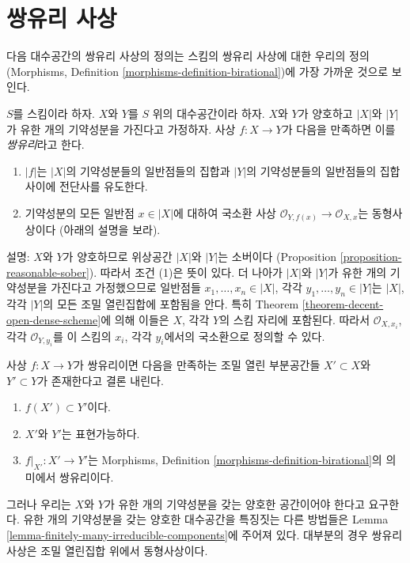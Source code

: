 \section{쌍유리 사상}
\label{section-birational}

\noindent
다음 대수공간의 쌍유리 사상의 정의는 스킴의 쌍유리 사상에 대한
우리의 정의(Morphisms, Definition
\ref{morphisms-definition-birational})에 가장 가까운 것으로 보인다.

\begin{definition}
\label{definition-birational}
$S$를 스킴이라 하자.
$X$와 $Y$를 $S$ 위의 대수공간이라 하자.
$X$와 $Y$가 양호하고 $|X|$와 $|Y|$가 유한 개의 기약성분을 가진다고
가정하자. 사상 $f : X \to Y$가 다음을 만족하면 이를
{\it 쌍유리}라고 한다.
\begin{enumerate}
\item $|f|$는 $|X|$의 기약성분들의 일반점들의 집합과 $|Y|$의
기약성분들의 일반점들의 집합 사이에 전단사를 유도한다.
\item 기약성분의 모든 일반점 $x \in |X|$에 대하여 국소환 사상
$\mathcal{O}_{Y, f(x)} \to \mathcal{O}_{X, x}$는 동형사상이다
(아래의 설명을 보라).
\end{enumerate}
\end{definition}

\noindent
설명: $X$와 $Y$가 양호하므로 위상공간 $|X|$와 $|Y|$는 소버이다
(Proposition \ref{proposition-reasonable-sober}). 따라서 조건 (1)은
뜻이 있다. 더 나아가 $|X|$와 $|Y|$가 유한 개의 기약성분을 가진다고
가정했으므로 일반점들 $x_1, \ldots, x_n \in |X|$, 각각
$y_1, \ldots, y_n \in |Y|$는 $|X|$, 각각 $|Y|$의 모든 조밀
열린집합에 포함됨을 안다. 특히 Theorem
\ref{theorem-decent-open-dense-scheme}에 의해 이들은 $X$, 각각
$Y$의 스킴 자리에 포함된다. 따라서 $\mathcal{O}_{X, x_i}$, 각각
$\mathcal{O}_{Y, y_i}$를 이 스킴의 $x_i$, 각각 $y_i$에서의
국소환으로 정의할 수 있다.

\medskip\noindent
사상 $f : X \to Y$가 쌍유리이면 다음을 만족하는 조밀 열린
부분공간들 $X' \subset X$와 $Y' \subset Y$가 존재한다고 결론 내린다.
\begin{enumerate}
\item $f(X') \subset Y'$이다.
\item $X'$와 $Y'$는 표현가능하다.
\item $f|_{X'} : X' \to Y'$는 Morphisms, Definition
\ref{morphisms-definition-birational}의 의미에서 쌍유리이다.
\end{enumerate}
그러나 우리는 $X$와 $Y$가 유한 개의 기약성분을 갖는 양호한
공간이어야 한다고 요구한다. 유한 개의 기약성분을 갖는 양호한
대수공간을 특징짓는 다른 방법들은 Lemma
\ref{lemma-finitely-many-irreducible-components}에 주어져 있다.
대부분의 경우 쌍유리 사상은 조밀 열린집합 위에서 동형사상이다.

